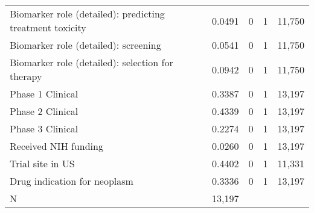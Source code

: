 \begin{table}[htbp]
\begin{tabular}{l*{1}{cccc}}
Biomarker role (detailed): predicting treatment toxicity&      0.0491&           0&           1&      11,750\\
Biomarker role (detailed): screening&      0.0541&           0&           1&      11,750\\
Biomarker role (detailed): selection for therapy&      0.0942&           0&           1&      11,750\\
Phase 1 Clinical    &      0.3387&           0&           1&      13,197\\
Phase 2 Clinical    &      0.4339&           0&           1&      13,197\\
Phase 3 Clinical    &      0.2274&           0&           1&      13,197\\
Received NIH funding&      0.0260&           0&           1&      13,197\\
Trial site in US    &      0.4402&           0&           1&      11,331\\
Drug indication for neoplasm&      0.3336&           0&           1&      13,197\\
\hline
N                   &      13,197&            &            &            \\
\hline\hline
\end{tabular}
\end{table}
